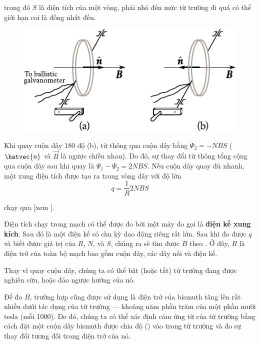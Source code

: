 \noindent
trong đó $S$ là diện tích của một vòng, phải nhỏ đến mức 
từ trường đi quá có thể giới hạn coi là đồng nhất đều.

\begin{figure}[!h]
	\begin{center}
		\includegraphics[scale=1]{figures/ch_08/fig_8_4.pdf}
		\caption[]{}
		\label{fig:8_4}
	\end{center}
	\vspace{-0.8cm}
\end{figure}

Khi quay cuộn dây $180$ độ (b), từ thông qua cuộn dây bằng $\Psi_2=-NBS$ ($\hatvec{n}$ và $\vec{B}$ là ngược chiều nhau).
Do đó, sự thay đổi từ thông tổng cộng qua cuộn dây sau khi quay là $\Psi_1 - \Psi_2 = 2NBS$. Nếu cuộn dây quay đủ nhanh, một xung điện tích được tạo ra trong vòng dây với độ lớn
\begin{equation}\label{eq:8_11}
	q = \frac{1}{R} 2NBS
\end{equation}

\noindent
chạy qua [xem ].

Điện tích chạy trong mạch có thể được đo bởi một máy đo gọi là \textbf{điện kế xung kích}.
Sau đó là một điện kế có chu kỳ dao động riêng rất lớn.
Sau khi đo được $q$ và biết được giá trị của $R$, $N$, và $S$, chúng ra sẽ tìm được $B$ theo .
Ở đây, $R$ là điện trở của toàn bộ mạch bao gồm cuộn dây, các dây nối và điện kế.

Thay vì quay cuộn dây, chúng ta có thể bật (hoặc tắt) từ trường đang được nghiên cứu, hoặc đảo ngược hướng của nó.

Để đo $B$, trường hợp cũng được sử dụng là điện trở của bismuth tăng lên rất nhiều dưới tác dụng của từ trường --- khoảng năm phần trăm của một phần mười tesla (mỗi \SI{1000}{\gauss}).
Do đó, chúng ta có thể xác định cảm ứng từ của từ trường bằng cách đặt một cuộn dây bismuth được chia độ () vào trong từ trường và đo sự thay đổi tương đối trong điện trở của nó.

